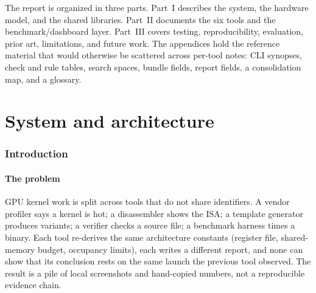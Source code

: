 \documentclass[11pt,twoside,a4paper]{article}
\begin{document}
The report is organized in three parts. Part~I describes the system, the
hardware model, and the shared libraries. Part~II documents the six tools and
the benchmark/dashboard layer. Part~III covers testing, reproducibility,
evaluation, prior art, limitations, and future work. The appendices hold the
reference material that would otherwise be scattered across per-tool notes:
CLI synopses, check and rule tables, search spaces, bundle fields, report
fields, a consolidation map, and a glossary.

\clearpage
\floraon
\thispagestyle{empty}
\tableofcontents
\clearpage
\floraoff

\listoffigures
{}
\listoftables
{}
\clearpage

\setcounter{page}{1}

\clearpage
\floraon
{}
\part{System and architecture}
\thispagestyle{empty}
\clearpage
\floraoff

\section{Introduction}
\label{sec:intro}

\subsection{The problem}
\label{sec:problem}

GPU kernel work is split across tools that do not share identifiers. A vendor
profiler says a kernel is hot; a disassembler shows the ISA; a template
generator produces variants; a verifier checks a source file; a benchmark
harness times a binary. Each tool re-derives the same architecture constants
(register file, shared-memory budget, occupancy limits), each writes a
different report, and none can show that its conclusion rests on the same
launch the previous tool observed. The result is a pile of local screenshots
and hand-copied numbers, not a reproducible evidence chain.
\end{document}
